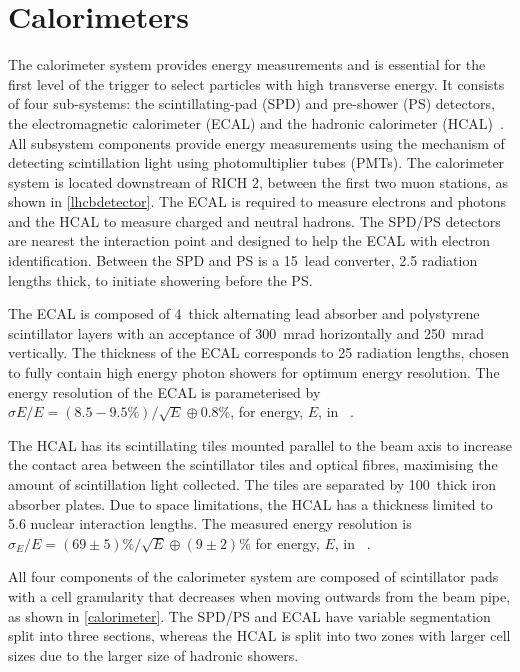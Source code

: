\section{Calorimeters}

The \lhcb calorimeter system provides energy measurements and is essential for the first level of the trigger to select particles with high transverse energy. It consists of four sub-systems: the scintillating-pad (SPD) and pre-shower (PS) detectors, the electromagnetic calorimeter (ECAL) and the hadronic calorimeter (HCAL)~\cite{LHCb-DP-2013-004}. All subsystem components provide energy measurements using the mechanism of detecting scintillation light using photomultiplier tubes (PMTs). The calorimeter system is located downstream of RICH 2, between the first two muon stations, as shown in \fig\ref{lhcbdetector}. The ECAL is required to measure electrons and photons and the HCAL to measure charged and neutral hadrons.  The SPD/PS detectors are nearest the interaction point and designed to help the ECAL with electron identification. Between the SPD and PS is a 15~\mm lead converter, 2.5 radiation lengths thick, to initiate showering before the PS. 

The ECAL is composed of 4~\mm thick alternating lead absorber and polystyrene scintillator layers with an acceptance of 300~mrad horizontally and 250~mrad vertically. The thickness of the ECAL corresponds to 25 radiation lengths, chosen to fully contain high energy photon showers for optimum energy resolution. The energy resolution of the ECAL is parameterised by $\sigma E/E = (8.5-9.5\%)/\sqrt{E} \oplus 0.8\%$, for energy, $E$, in \gev~\cite{calo_latest}.

The HCAL has its scintillating tiles mounted parallel to the beam axis to increase the contact area between the scintillator tiles and optical fibres, maximising the amount of scintillation light collected. The tiles are separated by 100~\mm thick iron absorber plates. Due to space limitations, the HCAL has a thickness limited to 5.6 nuclear interaction lengths. The measured energy resolution is $\sigma_E/E = (69 \pm 5)\%/\sqrt{E} \oplus (9 \pm 2)\%$ for energy, $E$, in \gev~\cite{calo_latest}.

All four components of the calorimeter system are composed of scintillator pads with a cell granularity that decreases when moving outwards from the beam pipe, as shown in \fig\ref{calorimeter}. The SPD/PS and ECAL have variable segmentation split into three sections, whereas the HCAL is split into two zones with larger cell sizes due to the larger size of hadronic showers.

